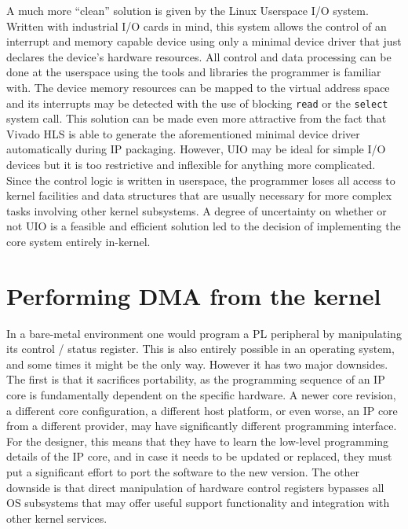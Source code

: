 A much more ``clean'' solution is given by the Linux Userspace I/O system. Written with industrial I/O cards
in mind, this system allows the control of an interrupt and memory capable device using only
a minimal device driver that just declares the device's hardware resources. All control and data processing
can be done at the userspace using the tools and libraries the programmer is familiar with. 
The device memory resources can be mapped to the virtual address space
and its interrupts may be detected with the use of blocking \texttt{read} or the \texttt{select} system call.
This solution can be made even more attractive from the fact that Vivado HLS is able to generate
the aforementioned minimal device driver automatically during IP packaging.
However, UIO may be ideal for simple I/O devices but it is too restrictive and inflexible for anything more complicated.
Since the control logic is written in userspace, the programmer loses all access to kernel facilities
and data structures that are usually necessary for more complex tasks involving other kernel subsystems.
A degree of uncertainty on whether or not UIO is a feasible and efficient solution led to the decision
of implementing the core system entirely in-kernel.

\section{Performing DMA from the kernel}

In a bare-metal environment one would program a PL peripheral by manipulating its control / status register.
This is also entirely possible in an operating system, and some times it might be the only way.
However it has two major downsides. The first is that it sacrifices portability, 
as the programming sequence of an IP core is fundamentally dependent on the specific hardware.
A newer core revision, a different core configuration, 
a different host platform, or even worse, an IP core from a different
provider, may have significantly different programming interface. For the designer, this means that
they have to learn the low-level programming details of the IP core, and in case it needs to be
updated or replaced, they must put a significant effort to port the software to the new version.
The other downside is that direct manipulation of hardware control registers bypasses all OS
subsystems that may offer useful support functionality and integration with other kernel services.

